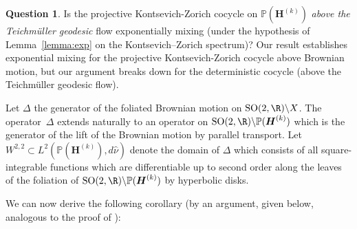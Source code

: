 \documentclass[JEP,XML,SOM,Unicode,published]{cedram}
\theoremstyle{plain}
\theoremstyle{definition}
\newtheorem{quest}[thm]{Question}
\numberwithin{equation}{subsection}
\newcommand\bP{\mathbb{P}}
\newcommand{\SO}{\mathrm{SO}}
\let\laplacian\Delta
\newcommand{\bfH}{\boldsymbol{H}}
\begin{document}
\begin{quest}\label{expmix} Is the projective Kontsevich-Zorich cocycle on $\bP(\bfH^{(k)})$ {\it above the Teichmüller geodesic} flow exponentially mixing
(under the hypothesis of Lemma~\ref{lemma:exp} on the Kontsevich--Zorich spectrum)? Our result establishes exponential mixing for the projective Kontsevich-Zorich cocycle above Brownian motion, but our argument breaks down for the deterministic cocycle (above the Teichmüller geodesic flow).

\end{quest}

Let $\laplacian$ the generator of the foliated Brownian
motion on $\SO(2, \R) \backslash X$. The operator~$\laplacian$ extends naturally to an operator on $\SO(2, \R) \backslash \bP(\bfH^{(k)})$ which is the generator of the lift of the Brownian motion by parallel transport. Let $W^{2,2} \subset L^2(\bP(\bfH^{(k)}), d\hat{\nu})$ denote the domain
of $\laplacian$ which consists of all square-integrable functions which are differentiable up to second order along the leaves of the foliation of $\SO(2, \R) \backslash \bP(\bfH^{(k)})$ by hyperbolic disks.

We can now derive the following corollary (by an argument, given below, analogous to the proof of \cite[Cor.\,1]{L95}):
\end{document}
